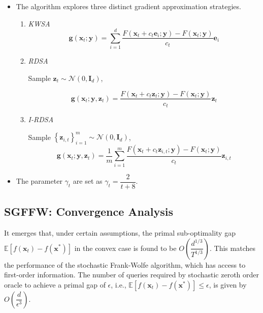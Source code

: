 \begin{multicols}{2}
\begin{itemize}[left=0pt,labelindent=0pt]
    \item The algorithm explores three distinct gradient approximation strategies.
    
    \begin{enumerate}[left=0pt,labelindent=0pt]
        \item \textit{KWSA}
        \small{
        $$
        \mathbf{g}\left(\mathbf{x}_t ; \mathbf{y}\right)=\sum_{i=1}^d \frac{F\left(\mathbf{x}_t+c_t \mathbf{e}_i ; \mathbf{y}\right)-F\left(\mathbf{x}_t ; \mathbf{y}\right)}{c_t} \mathbf{e}_i
        $$
        }
        \item \textit{RDSA}

        Sample $\mathbf{z}_t \sim \mathcal{N}\left(0, \mathbf{I}_d\right)$,
        
        \small{
        $$
        \mathbf{g}\left(\mathbf{x}_t ; \mathbf{y}, \mathbf{z}_t\right)=\frac{F\left(\mathbf{x}_t+c_t \mathbf{z}_t ; \mathbf{y}\right)-F\left(\mathbf{x}_t ; \mathbf{y}\right)}{c_t} \mathbf{z}_t
        $$
        }

        \item \textit{I-RDSA}
        
        Sample $\left\{\mathbf{z}_{i, t}\right\}_{i=1}^m \sim \mathcal{N}\left(0, \mathbf{I}_d\right)$,
        \small{
        $$
        \mathbf{g}\left(\mathbf{x}_t ; \mathbf{y}, \mathbf{z}_t\right)=\frac{1}{m} \sum_{i=1}^m \frac{F\left(\mathbf{x}_t+c_t \mathbf{z}_{i, t} ; \mathbf{y}\right)-F\left(\mathbf{x}_t ; \mathbf{y}\right)}{c_t} \mathbf{z}_{i, t}
        $$
        }
    \end{enumerate}
    
    \item The parameter  $\gamma_t$ are set as $\gamma_t=\dfrac{2}{t+8}$.
\end{itemize}


\subsection{SGFFW: Convergence Analysis}

It emerges that, under certain assumptions, the primal sub-optimality gap 
$\mathbb{E}\left[f\left(\mathbf{x}_t\right)-f\left(\mathbf{x}^*\right)\right]$ 
in the convex case is found to be $O(\dfrac{d^{1/3}}{T^{1/3}})$. 
This matches the performance of the stochastic Frank-Wolfe algorithm, 
which has access to first-order information. The number of queries required by 
stochastic zeroth order oracle to achieve a primal gap of $\epsilon$, i.e., 
$\mathbb{E}\left[f\left(\mathbf{x}_t\right)-f\left(\mathbf{x}^*\right)\right] \leq \epsilon$, 
is given by $O\left(\dfrac{d}{\epsilon^3}\right)$. 


\end{multicols}
